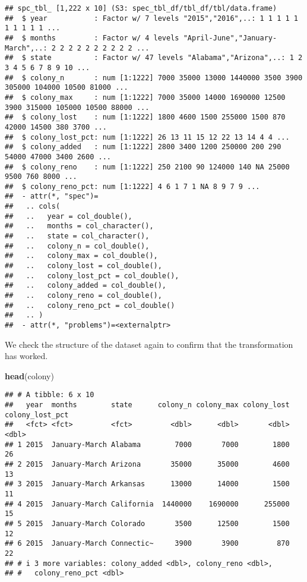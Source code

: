\documentclass[
]{article}
\newenvironment{Shaded}{\begin{snugshade}}{\end{snugshade}}
\newcommand{\FunctionTok}[1]{\textcolor[rgb]{0.13,0.29,0.53}{\textbf{#1}}}
\newcommand{\NormalTok}[1]{#1}
\begin{document}
\begin{verbatim}
## spc_tbl_ [1,222 x 10] (S3: spec_tbl_df/tbl_df/tbl/data.frame)
##  $ year           : Factor w/ 7 levels "2015","2016",..: 1 1 1 1 1 1 1 1 1 1 ...
##  $ months         : Factor w/ 4 levels "April-June","January-March",..: 2 2 2 2 2 2 2 2 2 2 ...
##  $ state          : Factor w/ 47 levels "Alabama","Arizona",..: 1 2 3 4 5 6 7 8 9 10 ...
##  $ colony_n       : num [1:1222] 7000 35000 13000 1440000 3500 3900 305000 104000 10500 81000 ...
##  $ colony_max     : num [1:1222] 7000 35000 14000 1690000 12500 3900 315000 105000 10500 88000 ...
##  $ colony_lost    : num [1:1222] 1800 4600 1500 255000 1500 870 42000 14500 380 3700 ...
##  $ colony_lost_pct: num [1:1222] 26 13 11 15 12 22 13 14 4 4 ...
##  $ colony_added   : num [1:1222] 2800 3400 1200 250000 200 290 54000 47000 3400 2600 ...
##  $ colony_reno    : num [1:1222] 250 2100 90 124000 140 NA 25000 9500 760 8000 ...
##  $ colony_reno_pct: num [1:1222] 4 6 1 7 1 NA 8 9 7 9 ...
##  - attr(*, "spec")=
##   .. cols(
##   ..   year = col_double(),
##   ..   months = col_character(),
##   ..   state = col_character(),
##   ..   colony_n = col_double(),
##   ..   colony_max = col_double(),
##   ..   colony_lost = col_double(),
##   ..   colony_lost_pct = col_double(),
##   ..   colony_added = col_double(),
##   ..   colony_reno = col_double(),
##   ..   colony_reno_pct = col_double()
##   .. )
##  - attr(*, "problems")=<externalptr>
\end{verbatim}

We check the structure of the dataset again to confirm that the
transformation has worked.

\begin{Shaded}
\begin{Highlighting}[]
\FunctionTok{head}\NormalTok{(colony)}
\end{Highlighting}
\end{Shaded}

\begin{verbatim}
## # A tibble: 6 x 10
##   year  months        state      colony_n colony_max colony_lost colony_lost_pct
##   <fct> <fct>         <fct>         <dbl>      <dbl>       <dbl>           <dbl>
## 1 2015  January-March Alabama        7000       7000        1800              26
## 2 2015  January-March Arizona       35000      35000        4600              13
## 3 2015  January-March Arkansas      13000      14000        1500              11
## 4 2015  January-March California  1440000    1690000      255000              15
## 5 2015  January-March Colorado       3500      12500        1500              12
## 6 2015  January-March Connectic~     3900       3900         870              22
## # i 3 more variables: colony_added <dbl>, colony_reno <dbl>,
## #   colony_reno_pct <dbl>
\end{verbatim}
\end{document}

